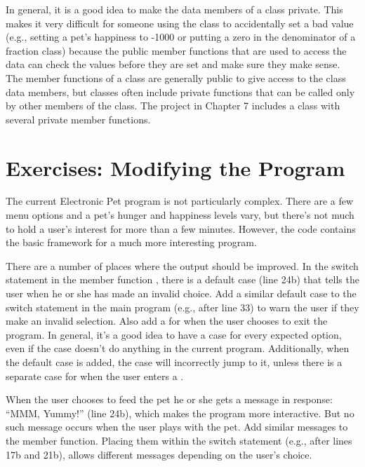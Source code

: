 In general, it is a good idea to make the data members of a class private.  This makes it very difficult for someone using the class to accidentally set a bad value (e.g., setting a pet's happiness to -1000 or putting a zero in the denominator of a fraction class) because the public member functions that are used to access the data can check the values before they are set and make sure they make sense.   The member functions of a class are generally public to give access to the class data members, but classes often include private functions that can be called only by other members of the class.  The project in Chapter 7 includes a class with several private member functions.


\vspace{+0.25cm}
{\color{\mycolor}\noindent\hrulefill}
\section{Exercises: Modifying the Program}

The current Electronic Pet program is not particularly complex.  There are a few menu options and a pet's hunger and happiness levels vary, but there's not much to hold a user's interest for more than a few minutes.  However, the code contains the basic framework for a much more interesting program. 


There are a number of places where the output should be improved.  
In the switch statement in the member function , there is a default case (line 24b) that tells the user when he or she has made an invalid choice.  Add a similar default case to the switch statement in the main program (e.g., after line 33) to warn the user if they make an invalid selection.  Also add a  for when the user chooses to exit the program.  In general, it's a good idea to have a case for every expected option, even if the case doesn't do anything in the current program.  Additionally, when the default case is added, the  case will incorrectly jump to it, unless there is a separate case for when the user enters a .


When the user chooses to feed the pet he or she gets a message in response: ``MMM, Yummy!'' (line 24b), which makes the program more interactive.  But no such message occurs when the user plays with the pet.  Add similar messages to the  member function.  Placing them within the switch statement (e.g., after lines 17b and 21b), allows different messages depending on the user's choice.  

